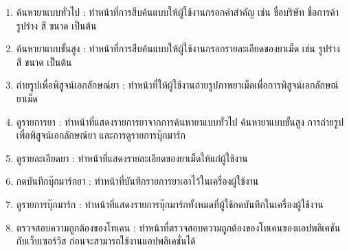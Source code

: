 	\begin{enumerate}
		\item ค้นหายาแบบทั่วไป : ทำหน้าที่การสืบค้นแบบให้ผู้ใช้งานกรอกคำสำคัญ เช่น ชื่อบริษัท ชื่อการค้า รูปร่าง สี ขนาด เป็นต้น
		\item ค้นหายาแบบขั้นสูง : ทำหน้าที่การสืบค้นแบบให้ผู้ใช้งานกรอกรายละเอียดของยาเม็ด เช่น รูปร่าง สี ขนาด เป็นต้น
		\item ถ่ายรูปเพื่อพิสูจน์เอกลักษณ์ยา : ทำหน้าที่ให้ผู้ใช้งานถ่ายรูปภาพยาเม็ดเพื่อการพิสูจน์เอกลักษณ์ยาเม็ด
		\item ดูรายการยา : ทำหน้าที่แสดงรายการยาจากการค้นหายาแบบทั่วไป ค้นหายาแบบขั้นสูง การถ่ายรูปเพื่อพิสูจน์เอกลักษณ์ยา และการดูรายการบุ๊กมาร์ก
		\item ดูรายละเอียดยา : ทำหน้าที่แสดงรายละเอียดของยาเม็ดให้แก่ผู้ใช้งาน
		\item กดบันทึกบุ๊กมาร์กยา : ทำหน้าที่บันทึกรายการยาเอาไว้ในเครื่องผู้ใช้งาน
		\item ดูรายการบุ๊กมาร์ก : ทำหน้าที่แสดงรายการบุ๊กมาร์กทั้งหมดที่ผู้ใช้กดบันทึกในเครื่องผู้ใช้งาน
		\item ตรวจสอบความถูกต้องของโทเคน : ทำหน้าที่ตรวจสอบความถูกต้องของโทเคนของแอปพลิเคชันกับเว็บเซอร์วิส ก่อนจะสามารถใช้งานแอปพลิเคชั่นได้
	\end{enumerate}

\newpage
